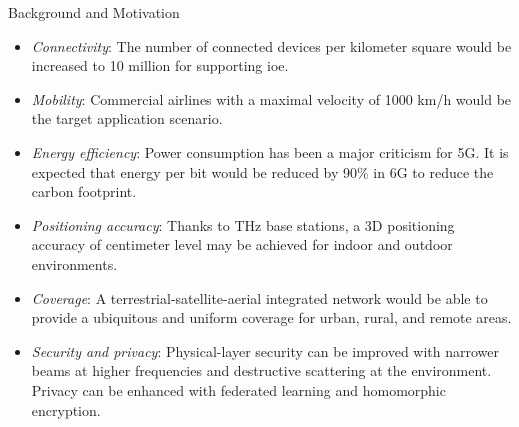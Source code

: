 \begin{section}{Background and Motivation}
\begin{itemize}
		\item \emph{Connectivity}: The number of connected devices per kilometer square would be increased to 10 million for supporting \gls{ioe}.
		\item \emph{Mobility}: Commercial airlines with a maximal velocity of 1000 km/h would be the target application scenario.
		\item \emph{Energy efficiency}: Power consumption has been a major criticism for 5G. It is expected that energy per bit would be reduced by 90\% in 6G to reduce the carbon footprint.
		\item \emph{Positioning accuracy}: Thanks to THz base stations, a 3D positioning accuracy of centimeter level may be achieved for indoor and outdoor environments.
		\item \emph{Coverage}: A terrestrial-satellite-aerial integrated network would be able to provide a ubiquitous and uniform coverage for urban, rural, and remote areas.
		\item \emph{Security and privacy}: Physical-layer security can be improved with narrower beams at higher frequencies and destructive scattering at the environment. Privacy can be enhanced with federated learning and homomorphic encryption.
	\end{itemize}


\end{section}
